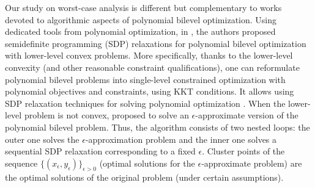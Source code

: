 \documentclass{article}
\newcommand{\firstvar}{x}
\newcommand{\secondvar}{y}
\newcommand{\jer}[1]{[[\textcolor{magenta}{#1}]]}
\theoremstyle{plain}
\theoremstyle{definition}
\begin{document}
\begin{appendices}
Our study on worst-case analysis is different but complementary to works devoted to algorithmic aspects of polynomial bilevel optimization. Using dedicated tools from polynomial optimization, in \cite{jeyakumar2016convergent}, the authors proposed semidefinite programming (SDP) relaxations for polynomial bilevel optimization with lower-level convex problems. More specifically, thanks to the lower-level convexity (and other reasonable constraint qualifications), one can reformulate polynomial bilevel problems into single-level constrained optimization with polynomial objectives and constraints, using KKT conditions. It allows using SDP relaxation techniques for solving polynomial optimization \cite{lasserre2001global}. When the lower-level problem is not convex, \cite{jeyakumar2016convergent,jiawang2017bilevel} proposed to solve an $\epsilon$-approximate version of the polynomial bilevel problem. Thus, the algorithm consists of two nested loops: the outer one solves the $\epsilon$-approximation problem and the inner one solves a sequential SDP relaxation corresponding to a fixed $\epsilon$. Cluster points of the sequence $\{(\firstvar_\epsilon, \secondvar_\epsilon)\}_{\epsilon > 0}$ (optimal solutions for the $\epsilon$-approximate problem) are the optimal solutions of the original problem (under certain assumptions). %



\end{appendices}
\end{document}
